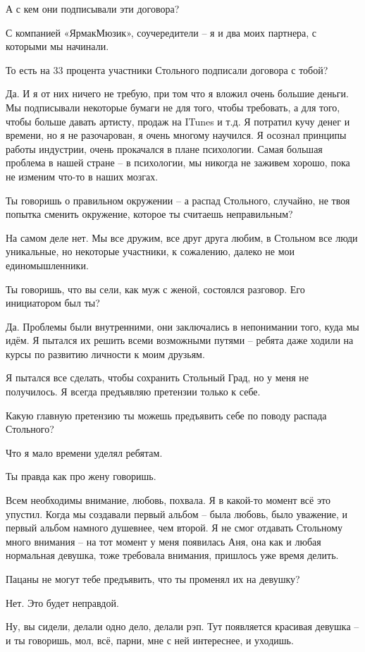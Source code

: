 А с кем они подписывали эти договора?

С компанией «ЯрмакМюзик», соучередители – я и два моих партнера, с которыми мы
начинали.

То есть на 33 процента участники Стольного подписали договора с тобой?

Да. И я от них ничего не требую, при том что я вложил очень большие деньги. Мы
подписывали некоторые бумаги не для того, чтобы требовать, а для того, чтобы
больше давать артисту, продаж на ITunes и т.д. Я потратил кучу денег и времени,
но я не разочарован, я очень многому научился. Я осознал принципы работы
индустрии, очень прокачался в плане психологии. Самая большая проблема в нашей
стране – в психологии, мы никогда не заживем хорошо, пока не изменим что-то в
наших мозгах.

Ты говоришь о правильном окружении – а распад Стольного, случайно, не твоя
попытка сменить окружение, которое ты считаешь неправильным?

На самом деле нет. Мы все дружим, все друг друга любим, в Стольном все люди
уникальные, но некоторые участники, к сожалению, далеко не мои единомышленники.

Ты говоришь, что вы сели, как муж с женой, состоялся разговор. Его инициатором
был ты?

Да. Проблемы были внутренними, они заключались в непонимании того, куда мы
идём. Я пытался их решить всеми возможными путями – ребята даже ходили на курсы
по развитию личности к моим друзьям.

Я пытался все сделать, чтобы сохранить Стольный Град, но у меня не получилось.
Я всегда предъявляю претензии только к себе.

Какую главную претензию ты можешь предъявить себе по поводу распада Стольного?

Что я мало времени уделял ребятам.

Ты правда как про жену говоришь.

Всем необходимы внимание, любовь, похвала. Я в какой-то момент всё это упустил.
Когда мы создавали первый альбом – была любовь, было уважение, и первый альбом
намного душевнее, чем второй. Я не смог отдавать Стольному много внимания – на
тот момент у меня появилась Аня, она как и любая нормальная девушка, тоже
требовала внимания, пришлось уже время делить.

Пацаны не могут тебе предъявить, что ты променял их на девушку?

Нет. Это будет неправдой.

Ну, вы сидели, делали одно дело, делали рэп. Тут появляется красивая девушка –
и ты говоришь, мол, всё, парни, мне с ней интереснее, и уходишь.

